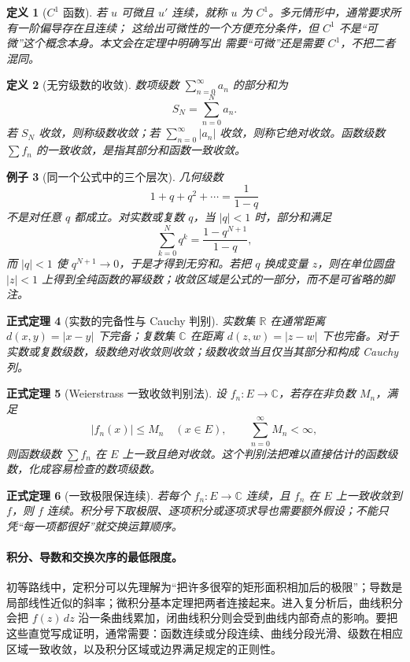 \documentclass[UTF8,fontset=none,a4paper,11pt]{ctexart}
\theoremstyle{foundation-definition}
\newtheorem{definition}{定义}[section]
\theoremstyle{foundation-theorem}
\newtheorem{theorem}[definition]{正式定理}
\theoremstyle{foundation-proposition}
\theoremstyle{foundation-example}
\newtheorem{example}[definition]{例子}
\theoremstyle{foundation-remark}
\theoremstyle{foundation-theorem}
\begin{document}
\begin{definition}[\(C^1\) 函数]\label{def:c1-function}
若 \(u\) 可微且 \(u'\) 连续，就称 \(u\) 为 \(C^1\)。多元情形中，通常要求所有一阶偏导存在且连续；
这给出可微性的一个方便充分条件，但 \(C^1\) 不是“可微”这个概念本身。本文会在定理中明确写出
需要“可微”还是需要 \(C^1\)，不把二者混同。
\end{definition}

\begin{definition}[无穷级数的收敛]\label{def:series-convergence}
数项级数 \(\sum_{n=0}^{\infty}a_n\) 的部分和为
\[
S_N=\sum_{n=0}^{N}a_n.
\]
若 \(S_N\) 收敛，则称级数收敛；若 \(\sum_{n=0}^{\infty}|a_n|\) 收敛，则称它绝对收敛。函数级数 \(\sum f_n\) 的一致收敛，是指其部分和函数一致收敛。
\end{definition}

\begin{example}[同一个公式中的三个层次]
几何级数
\[
1+q+q^2+\cdots=\frac{1}{1-q}
\]
不是对任意 \(q\) 都成立。对实数或复数 \(q\)，当 \(|q|<1\) 时，部分和满足
\[
\sum_{k=0}^{N}q^k=\frac{1-q^{N+1}}{1-q},
\]
而 \(|q|<1\) 使 \(q^{N+1}\to0\)，于是才得到无穷和。若把 \(q\) 换成变量 \(z\)，则在单位圆盘 \(|z|<1\) 上得到全纯函数的幂级数；收敛区域是公式的一部分，而不是可省略的脚注。
\end{example}

\begin{theorem}[实数的完备性与 Cauchy 判别]
实数集 \(\mathbb R\) 在通常距离 \(d(x,y)=|x-y|\) 下完备；复数集 \(\mathbb C\) 在距离 \(d(z,w)=|z-w|\) 下也完备。对于实数或复数级数，级数绝对收敛则收敛；级数收敛当且仅当其部分和构成 Cauchy 列。
\end{theorem}

\begin{theorem}[Weierstrass 一致收敛判别法]
设 \(f_n:E\to\mathbb C\)，若存在非负数 \(M_n\)，满足
\[
|f_n(x)|\leq M_n\quad(x\in E),
\qquad \sum_{n=0}^{\infty}M_n<\infty,
\]
则函数级数 \(\sum f_n\) 在 \(E\) 上一致且绝对收敛。这个判别法把难以直接估计的函数级数，化成容易检查的数项级数。
\end{theorem}

\begin{theorem}[一致极限保连续]
若每个 \(f_n:E\to\mathbb C\) 连续，且 \(f_n\) 在 \(E\) 上一致收敛到 \(f\)，则 \(f\) 连续。积分号下取极限、逐项积分或逐项求导也需要额外假设；不能只凭“每一项都很好”就交换运算顺序。
\end{theorem}

\paragraph{积分、导数和交换次序的最低限度。}
初等路线中，定积分可以先理解为“把许多很窄的矩形面积相加后的极限”；导数是局部线性近似的斜率；微积分基本定理把两者连接起来。进入复分析后，曲线积分会把 \(f(z)\,dz\) 沿一条曲线累加，闭曲线积分则会受到曲线内部奇点的影响。要把这些直觉写成证明，通常需要：函数连续或分段连续、曲线分段光滑、级数在相应区域一致收敛，以及积分区域或边界满足规定的正则性。
\end{document}
